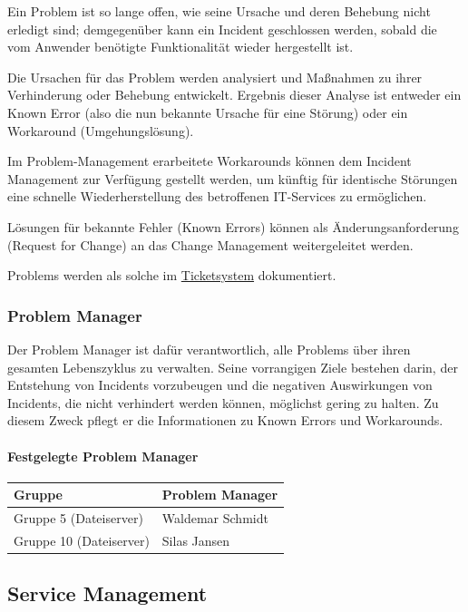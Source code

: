 \documentclass[]{article}
\let\oldparagraph\paragraph
\renewcommand{\paragraph}[1]{\oldparagraph{#1}\mbox{}}
\begin{document}
Ein Problem ist so lange offen, wie seine Ursache und deren Behebung
nicht erledigt sind; demgegenüber kann ein Incident geschlossen werden,
sobald die vom Anwender benötigte Funktionalität wieder hergestellt ist.

Die Ursachen für das Problem werden analysiert und Maßnahmen zu ihrer
Verhinderung oder Behebung entwickelt. Ergebnis dieser Analyse ist
entweder ein Known Error (also die nun bekannte Ursache für eine
Störung) oder ein Workaround (Umgehungslösung).

Im Problem-Management erarbeitete Workarounds können dem Incident
Management zur Verfügung gestellt werden, um künftig für identische
Störungen eine schnelle Wiederherstellung des betroffenen IT-Services zu
ermöglichen.

Lösungen für bekannte Fehler (Known Errors) können als
Änderungsanforderung (Request for Change) an das Change Management
weitergeleitet werden.

Problems werden als solche im
\href{https://docs.google.com/spreadsheets/d/1GDq3AEsVDu1a-X7tEl6qKDtSZdAXm8lsRzY6Ijw-dUQ/edit\#gid=0}{Ticketsystem}
dokumentiert.

\subsubsection{Problem Manager}\label{problem-manager}

Der Problem Manager ist dafür verantwortlich, alle Problems über ihren
gesamten Lebenszyklus zu verwalten. Seine vorrangigen Ziele bestehen
darin, der Entstehung von Incidents vorzubeugen und die negativen
Auswirkungen von Incidents, die nicht verhindert werden können,
möglichst gering zu halten. Zu diesem Zweck pflegt er die Informationen
zu Known Errors und Workarounds.

\paragraph{Festgelegte Problem
Manager}\label{festgelegte-problem-manager}

\begin{longtable}{ll}
\toprule
Gruppe & Problem Manager\tabularnewline
\midrule
Gruppe 5 (Dateiserver) & Waldemar Schmidt\tabularnewline
Gruppe 10 (Dateiserver) & Silas Jansen\tabularnewline
\bottomrule
\end{longtable}

\subsection{Service Management}\label{service-management}
\end{document}
